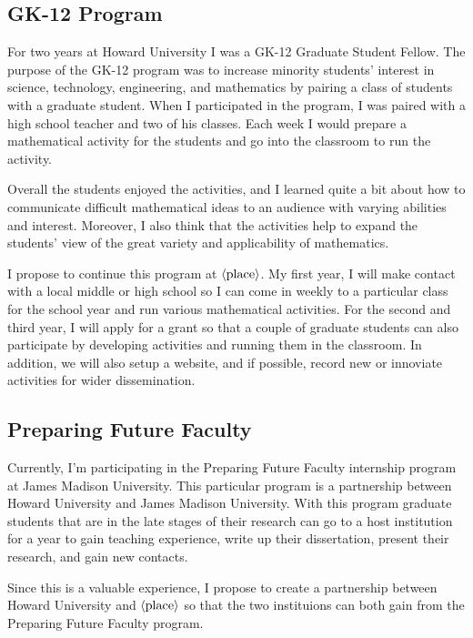 \documentclass[12pt]{article}
\theoremstyle{plain}
\theoremstyle{definition}
\newcommand{\la}{\langle}
\newcommand{\ra}{\rangle}
\begin{document}
\subsection{GK-12 Program}
For two years at Howard University I was a GK-12 Graduate Student
Fellow. 
The purpose of the GK-12 program was to increase 
minority students' interest in science, technology, engineering, and
mathematics by pairing a class of students with a graduate
student. 
When I participated in the program, I was paired with a high school
teacher and two of his classes. 
Each week I would prepare a mathematical activity for the students and
go into the classroom to run the activity.

Overall the students enjoyed the activities, and I learned quite a bit
about how to communicate difficult mathematical ideas to an audience
with varying abilities and interest. 
Moreover, I also think that the activities help to expand the
students' view of the great variety and applicability of mathematics. 

I propose to continue this program at $\la\hbox{place}\ra$.
My first year, I will make contact with a local middle or high school
so I can
come in weekly to a particular class for the school year and run
various mathematical activities. 
For the second and third year, I will apply for a grant so that a
couple of graduate students can also participate by developing
activities and running them in the classroom. 
In addition, we will also setup a website, and if possible, record new
or innoviate activities for wider dissemination. 

\subsection{Preparing Future Faculty}
Currently, I'm participating in the Preparing Future Faculty
internship program at James Madison University. 
This particular program is a partnership between Howard University and
James Madison University.
With this program
graduate students that are in the late stages of their research can go
to a host institution  for a year to gain teaching experience, 
write up their dissertation, present their research, and gain new
contacts.

Since this is a valuable experience, 
I propose to create a partnership between Howard University and
$\la\hbox{place}\ra$ so that the two instituions can both gain from
the Preparing Future Faculty program.




\end{document}
